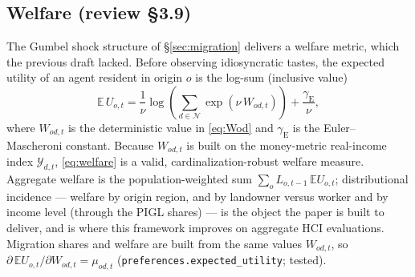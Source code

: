 \documentclass[11pt]{article}
\newcommand{\Nreg}{\mathcal{N}}
\begin{document}
\subsection{Welfare (review \S3.9)}\label{sec:welfare}
The Gumbel shock structure of \S\ref{sec:migration} delivers a welfare metric, which the
previous draft lacked. Before observing idiosyncratic tastes, the expected utility of an
agent resident in origin $o$ is the log-sum (inclusive value)
\begin{equation}
  \mathbb{E}\,U_{o,t}
  = \frac{1}{\nu}\log\!\left(\sum_{d\in\Nreg}\exp(\nu\, W_{od,t})\right)
  + \frac{\gamma_{\mathrm{E}}}{\nu},
  \label{eq:welfare}
\end{equation}
where $W_{od,t}$ is the deterministic value in \eqref{eq:Wod} and $\gamma_{\mathrm{E}}$ is
the Euler--Mascheroni constant. Because $W_{od,t}$ is built on the money-metric real-income
index $\mathcal{Y}_{d,t}$, \eqref{eq:welfare} is a valid, cardinalization-robust welfare
measure. Aggregate welfare is the population-weighted sum $\sum_o L_{o,t-1}\,\mathbb{E}U_{o,t}$;
distributional incidence --- welfare by origin region, and by landowner versus worker and
by income level (through the PIGL shares) --- is the object the paper is built to deliver,
and is where this framework improves on aggregate HCI evaluations.
Migration shares and welfare are built from the same values $W_{od,t}$, so
$\partial\,\mathbb{E}U_{o,t}/\partial W_{od,t}=\mu_{od,t}$
(\texttt{preferences.expected\_utility}; tested).
\end{document}

